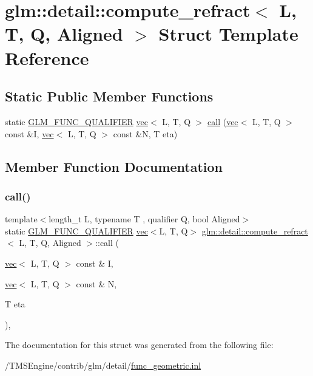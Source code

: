 \hypertarget{structglm_1_1detail_1_1compute__refract}{}\section{glm\+:\+:detail\+:\+:compute\+\_\+refract$<$ L, T, Q, Aligned $>$ Struct Template Reference}
\label{structglm_1_1detail_1_1compute__refract}
\subsection*{Static Public Member Functions}
\begin{DoxyCompactItemize}
\item 
static \hyperlink{setup_8hpp_a33fdea6f91c5f834105f7415e2a64407}{G\+L\+M\+\_\+\+F\+U\+N\+C\+\_\+\+Q\+U\+A\+L\+I\+F\+I\+ER} \hyperlink{structglm_1_1vec}{vec}$<$ L, T, Q $>$ \hyperlink{structglm_1_1detail_1_1compute__refract_a17b1fde43c425c596ff032f5a92f15de}{call} (\hyperlink{structglm_1_1vec}{vec}$<$ L, T, Q $>$ const \&I, \hyperlink{structglm_1_1vec}{vec}$<$ L, T, Q $>$ const \&N, T eta)
\end{DoxyCompactItemize}


\subsection{Member Function Documentation}
\mbox{\label{structglm_1_1detail_1_1compute__refract_a17b1fde43c425c596ff032f5a92f15de}} 
\subsubsection{\texorpdfstring{call()}{call()}}
{\footnotesize\ttfamily template$<$length\+\_\+t L, typename T , qualifier Q, bool Aligned$>$ \\
static \hyperlink{setup_8hpp_a33fdea6f91c5f834105f7415e2a64407}{G\+L\+M\+\_\+\+F\+U\+N\+C\+\_\+\+Q\+U\+A\+L\+I\+F\+I\+ER} \hyperlink{structglm_1_1vec}{vec}$<$L, T, Q$>$ \hyperlink{structglm_1_1detail_1_1compute__refract}{glm\+::detail\+::compute\+\_\+refract}$<$ L, T, Q, Aligned $>$\+::call (\begin{DoxyParamCaption}\item[{\hyperlink{structglm_1_1vec}{vec}$<$ L, T, Q $>$ const \&}]{I,  }\item[{\hyperlink{structglm_1_1vec}{vec}$<$ L, T, Q $>$ const \&}]{N,  }\item[{T}]{eta }\end{DoxyParamCaption})\hspace{0.3cm}{\ttfamily [inline]}, {\ttfamily [static]}}



The documentation for this struct was generated from the following file\+:\begin{DoxyCompactItemize}
\item 
/\+T\+M\+S\+Engine/contrib/glm/detail/\hyperlink{func__geometric_8inl}{func\+\_\+geometric.\+inl}\end{DoxyCompactItemize}
